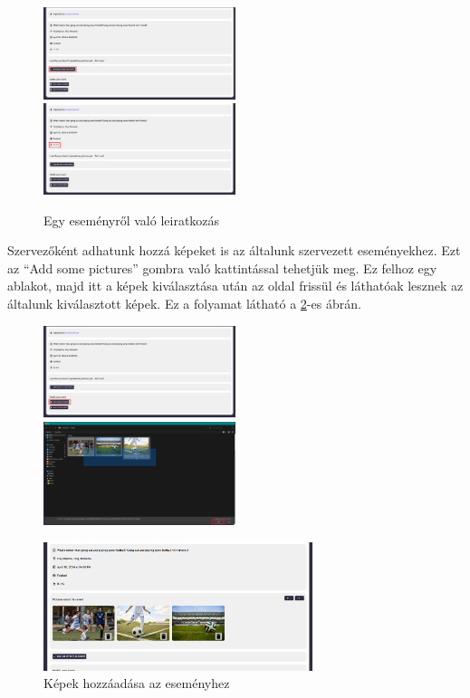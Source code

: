 \begin{figure}[h]
	\includegraphics[width=0.5\textwidth]{images/resign_from_event_1.png}
	\includegraphics[width=0.5\textwidth]{images/resign_from_event_2.png}
	\caption{Egy eseményről való leiratkozás}
	\label{fig:resign_from_event}
\end{figure}

Szervezőként adhatunk hozzá képeket is az általunk szervezett eseményekhez. Ezt az ``Add some pictures'' gombra való kattintással tehetjük meg.
Ez felhoz egy ablakot, majd itt a képek kiválasztása után az oldal frissül és láthatóak lesznek az általunk kiválasztott képek. Ez a folyamat
látható a \ref{fig:add_pictures_event}-es ábrán.

\newpage

\begin{figure}[ht]
	\includegraphics[width=0.5\textwidth]{images/add_pictures_event.png}
	\includegraphics[width=0.5\textwidth]{images/add_pictures_event_2.png}
	\begin{center}
		\includegraphics[width=0.7\textwidth]{images/add_pictures_event_3.png}
	\end{center}
	\caption{Képek hozzáadása az eseményhez}
	\label{fig:add_pictures_event}
\end{figure}

